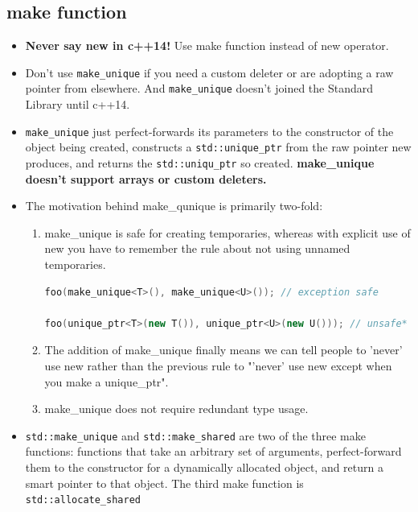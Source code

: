 \documentclass[a4paper,11pt,twoside]{book}
\begin{document}
\subsection{make function}
\begin{itemize}
	\item \textbf{Never say new in c++14!} Use make function instead of new operator.
	
	\item Don't use \texttt{make\_unique} if you need a custom deleter or are adopting a raw pointer from elsewhere. And \texttt{make\_unique} doesn't joined the Standard Library until c++14.
	
	\item \texttt{make\_unique} just perfect-forwards its parameters to the constructor of the object being created, constructs a \texttt{std::unique\_ptr} from the raw pointer new produces, and returns the \texttt{std::uniqu\_ptr} so created. \textbf{make\_unique doesn't support arrays or custom deleters.}
	
	\item The motivation behind make\_qunique is primarily two-fold:
	\begin{enumerate}
		\item make\_unique is safe for creating temporaries, whereas with explicit use of new you have to remember the rule about not using unnamed temporaries.
\begin{lstlisting}[frame=single, language=c++, mathescape=true]
foo(make_unique<T>(), make_unique<U>()); // exception safe

foo(unique_ptr<T>(new T()), unique_ptr<U>(new U())); // unsafe*	
\end{lstlisting}	
		
		\item The addition of make\_unique finally means we can tell people to 'never' use new rather than the previous rule to "'never' use new except when you make a unique\_ptr".
		
		\item make\_unique does not require redundant type usage. 
	\end{enumerate}
	
	
	\item \texttt{std::make\_unique} and \texttt{std::make\_shared} are two of the three make functions: functions that take an arbitrary set of arguments, perfect-forward them to the constructor for a dynamically allocated object, and return a smart pointer to that object. The third make function is \texttt{std::allocate\_shared}
	

\end{itemize}
\end{document}
